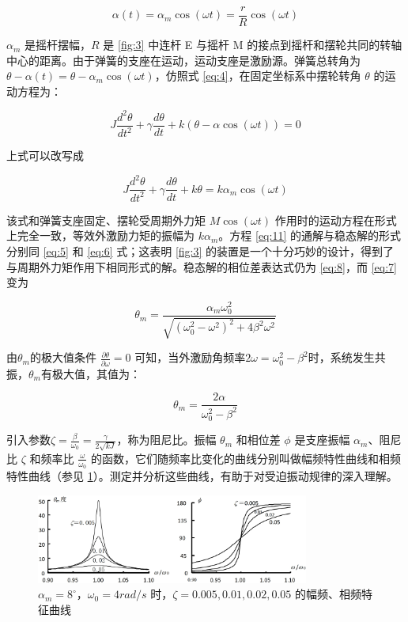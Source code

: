 \documentclass[12pt,a4paper]{amsart}
\begin{document}
\begin{equation}
	\alpha(t) = \alpha_m \cos(\omega t) = \frac{r}{R}\cos(\omega t) \label{eq:9}
\end{equation}

$\alpha_m$ 是摇杆摆幅，$R$ 是 \ref{fig:3} 中连杆 E 与摇杆 M 的接点到摇杆和摆轮共同的转轴中心的距离。由于弹簧的支座在运动，运动支座是激励源。弹簧总转角为 $\theta-\alpha(t)=\theta-\alpha_m\cos(\omega t)$，仿照式 \ref{eq:4}，在固定坐标系中摆轮转角 $\theta$ 的运动方程为：

\begin{equation}
	J\frac{d^2\theta}{dt^2} + \gamma\frac{d\theta}{dt} + k(\theta - \alpha\cos(\omega t)) = 0 \label{eq:10}
\end{equation}

上式可以改写成

\begin{equation}
	J\frac{d^2\theta}{dt^2} + \gamma\frac{d\theta}{dt} + k\theta = k\alpha_m\cos(\omega t) \label{eq:11}
\end{equation}

该式和弹簧支座固定、摆轮受周期外力矩 $M\cos(\omega t)$ 作用时的运动方程在形式上完全一致，等效外激励力矩的振幅为 $k\alpha_m$。方程 \ref{eq:11} 的通解与稳态解的形式分别同 \ref{eq:5} 和 \ref{eq:6} 式；这表明 \ref{fig:3} 的装置是一个十分巧妙的设计，得到了与周期外力矩作用下相同形式的解。稳态解的相位差表达式仍为 \ref{eq:8}，而 \ref{eq:7} 变为

\begin{equation}
	\theta_m = \frac{\alpha_m\omega_0^2}{\sqrt{(\omega_0^2 - \omega^2)^2 + 4\beta^2\omega^2}} \label{eq:12}
\end{equation}

由$\theta_m$的极大值条件 $\frac{\partial \theta}{\partial \omega}=0$ 可知，当外激励角频率$2\omega = \omega_0^2 - \beta^2$时，系统发生共振，$\theta_m$有极大值，其值为：

\begin{equation}
	\theta_m = \frac{2\alpha}{\omega_0^2 - \beta^2} \label{eq:13}
\end{equation}

引入参数$\zeta = \frac{\beta}{\omega_0} = \frac{\gamma}{2\sqrt{kJ}}$，称为阻尼比。振幅 $\theta_m$ 和相位差 $\phi$ 是支座振幅 $\alpha_m$、阻尼比 $\zeta$ 和频率比 $\frac{\omega}{\omega_0}$ 的函数，它们随频率比变化的曲线分别叫做幅频特性曲线和相频特性曲线（参见 \ref{fig:graph}）。测定并分析这些曲线，有助于对受迫振动规律的深入理解。

\begin{figure}[H]
	\centering
	\includegraphics[width=0.8\textwidth]{img/graph.jpg}
	\caption{$\alpha_m=8^\circ$，$\omega_0=4 rad/s$ 时，$\zeta=0.005, 0.01, 0.02, 0.05$ 的幅频、相频特征曲线}
	\label{fig:graph}
\end{figure}
\end{document}
